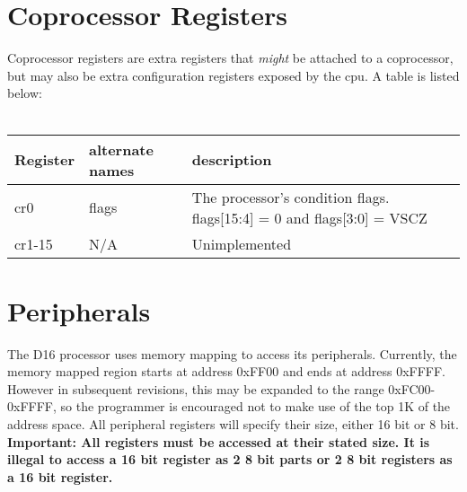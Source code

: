 \documentclass{article}
\begin{document}
        \section{Coprocessor Registers}
        Coprocessor registers are extra registers that \textit{might}
        be attached to a coprocessor, but may also be extra
        configuration registers exposed by the cpu. A table is listed below: \\ \\
        \begin{tabular}{|l | l | l|}\hline
          Register & alternate names & description \\ \hline
          cr0 & flags & The processor's condition flags. flags[15:4] = 0 and flags[3:0] = VSCZ \\ \hline
          cr1-15 & N/A & Unimplemented \\ \hline
        \end{tabular}
        \newpage
        \section{Peripherals}
        The D16 processor uses memory mapping to access its peripherals. Currently, the memory mapped region starts at address 0xFF00 and ends at address 0xFFFF. However in subsequent revisions, this may be expanded to the range 0xFC00-0xFFFF, so the programmer is encouraged not to make use of the top 1K of the address space.
        All peripheral registers will specify their size, either 16 bit or 8 bit. \textbf{Important: All registers must be accessed at their stated size. It is illegal to access a 16 bit register as 2 8 bit parts or 2 8 bit registers as a 16 bit register.}
\end{document}
